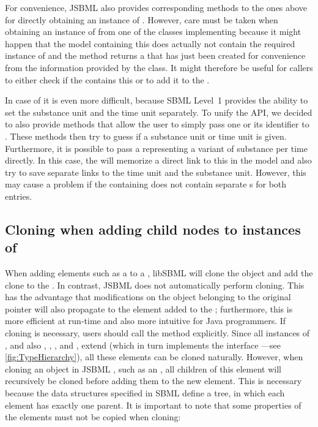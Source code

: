 
For convenience, JSBML also provides corresponding methods to the ones
above for directly obtaining an instance of \UnitDefinition.  However, care
must be taken when obtaining an instance of \UnitDefinition from one of the
classes implementing \SBaseWithUnit because it might happen that the
model containing this \SBaseWithUnit does actually not contain
the required instance of \UnitDefinition and the method returns a
 that has just been created for convenience from the
information provided by the class. It might therefore be useful for callers
to either check if the \Model{} contains this \UnitDefinition or to add it
to the \Model.

In case of \KineticLaw it is even more difficult, because SBML
Level~1 provides the ability to set the substance unit
and the time unit separately. To unify the API, we decided to also provide methods that
allow the user to simply pass one \UnitDefinition or its identifier to
\KineticLaw.  These methods then try to guess if a substance unit or time
unit is given. Furthermore, it is possible to pass a \UnitDefinition
representing a variant of substance per time directly. In this case, the
\KineticLaw will memorize a direct link to this \UnitDefinition in the
model and also try to save separate links to the time unit and
the substance unit. However, this may cause a problem if the containing
\Model does not contain separate \UnitDefinition{}s for both entries.


\subsection{Cloning when adding child nodes to instances of }

When adding elements such as a \Species to a \Model, libSBML 
will clone the object and add the clone to the \Model. In contrast, JSBML
does not automatically perform cloning. This has the advantage that
modifications on the object belonging to the original pointer will also
propagate to the element added to the \Model; furthermore, this is more
efficient at run-time and also more intuitive for Java programmers. If
cloning is necessary, users should call the  method
explicitly. Since all instances of \SBase, and also \Annotation, \ASTNode,
\CVTerm, and \History, extend \AbstractTreeNode (which in turn implements the
interface \Cloneable---see \vref{fig:TypeHierarchy}), all these elements can
be cloned naturally.  However, when cloning an object in JSBML
, such as an \AbstractNamedSBase, all children of this element
will recursively be cloned before adding them to the new element. This is
necessary because the data structures specified in SBML
 define a tree, in which each element has
exactly one parent. It is important to note that some properties of the
elements must not be copied when cloning:

